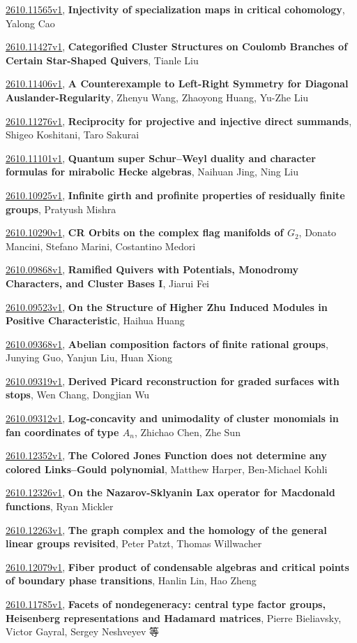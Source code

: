 \documentclass[9pt, a4paper]{article}
\theoremstyle{plain}
\theoremstyle{definition}
\theoremstyle{remark}
\newcommand{\arxiv}[3]{\href{https://arxiv.org/abs/#1}{#1}, \textbf{\textcolor{arxivblue}{#2}}, #3}
\begin{document}
\arxiv{2610.11565v1}{Injectivity of specialization maps in critical cohomology}{Yalong Cao}

\arxiv{2610.11427v1}{Categorified Cluster Structures on Coulomb Branches of Certain Star-Shaped Quivers}{Tianle Liu}

\arxiv{2610.11406v1}{A Counterexample to Left-Right Symmetry for Diagonal Auslander-Regularity}{Zhenyu Wang, Zhaoyong Huang, Yu-Zhe Liu}

\arxiv{2610.11276v1}{Reciprocity for projective and injective direct summands}{Shigeo Koshitani, Taro Sakurai}

\arxiv{2610.11101v1}{Quantum super Schur--Weyl duality and character formulas for mirabolic Hecke algebras}{Naihuan Jing, Ning Liu}

\arxiv{2610.10925v1}{Infinite girth and profinite properties of residually finite groups}{Pratyush Mishra}

\arxiv{2610.10290v1}{CR Orbits on the complex flag manifolds of $G_2$}{Donato Mancini, Stefano Marini, Costantino Medori}

\arxiv{2610.09868v1}{Ramified Quivers with Potentials, Monodromy Characters, and Cluster Bases I}{Jiarui Fei}

\arxiv{2610.09523v1}{On the Structure of Higher Zhu Induced Modules in Positive Characteristic}{Haihua Huang}

\arxiv{2610.09368v1}{Abelian composition factors of finite rational groups}{Junying Guo, Yanjun Liu, Huan Xiong}

\arxiv{2610.09319v1}{Derived Picard reconstruction for graded surfaces with stops}{Wen Chang, Dongjian Wu}

\arxiv{2610.09312v1}{Log-concavity and unimodality of cluster monomials in fan coordinates of type $A_n$}{Zhichao Chen, Zhe Sun}

\arxiv{2610.12352v1}{The Colored Jones Function does not determine any colored Links--Gould polynomial}{Matthew Harper, Ben-Michael Kohli}

\arxiv{2610.12326v1}{On the Nazarov-Sklyanin Lax operator for Macdonald functions}{Ryan Mickler}

\arxiv{2610.12263v1}{The graph complex and the homology of the general linear groups revisited}{Peter Patzt, Thomas Willwacher}

\arxiv{2610.12079v1}{Fiber product of condensable algebras and critical points of boundary phase transitions}{Hanlin Lin, Hao Zheng}

\arxiv{2610.11785v1}{Facets of nondegeneracy: central type factor groups, Heisenberg representations and Hadamard matrices}{Pierre Bieliavsky, Victor Gayral, Sergey Neshveyev 等}
\end{document}
